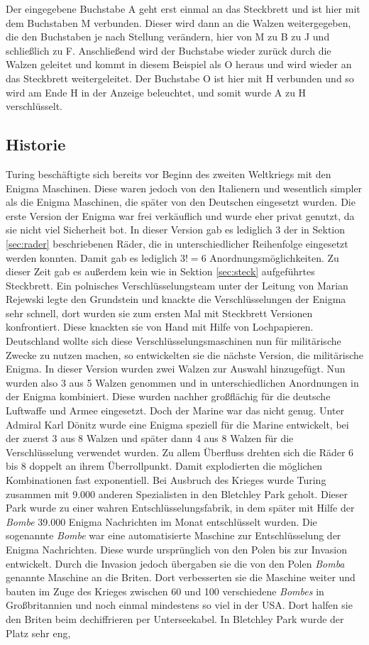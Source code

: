 Der eingegebene Buchstabe A geht erst einmal an das Steckbrett und ist hier mit dem Buchstaben M verbunden. Dieser wird dann an die Walzen weitergegeben, die den Buchstaben je nach Stellung verändern, hier von M zu B zu J und schließlich zu F. Anschließend wird der Buchstabe wieder zurück durch die Walzen geleitet und kommt in diesem Beispiel als O heraus und wird wieder an das Steckbrett weitergeleitet. Der Buchstabe O ist hier mit H verbunden und so wird am Ende H in der Anzeige beleuchtet, und somit wurde A zu H verschlüsselt.

\subsection{Historie}
Turing beschäftigte sich bereits vor Beginn des zweiten Weltkriegs mit den Enigma Maschinen. Diese waren jedoch von den Italienern und wesentlich simpler als die Enigma Maschinen, die später von den Deutschen eingesetzt wurden. Die erste Version der Enigma war frei verkäuflich und wurde eher privat genutzt, da sie nicht viel Sicherheit bot. In dieser Version gab es lediglich 3 der in Sektion \ref{sec:rader} beschriebenen Räder, die in unterschiedlicher Reihenfolge eingesetzt werden konnten. Damit gab es lediglich $3! = 6$ Anordnungsmöglichkeiten. Zu dieser Zeit gab es außerdem kein wie in Sektion \ref{sec:steck} aufgeführtes Steckbrett. Ein polnisches Verschlüsselungsteam unter der Leitung von Marian Rejewski legte den Grundstein und knackte die Verschlüsselungen der Enigma sehr schnell, dort wurden sie zum ersten Mal mit Steckbrett Versionen konfrontiert. Diese knackten sie von Hand mit Hilfe von Lochpapieren. Deutschland wollte sich diese Verschlüsselungsmaschinen nun für militärische Zwecke zu nutzen machen, so entwickelten sie die nächste Version, die militärische Enigma. In dieser Version wurden zwei Walzen zur Auswahl hinzugefügt. Nun wurden also 3 aus 5 Walzen genommen und in unterschiedlichen Anordnungen in der Enigma kombiniert. Diese wurden nachher großflächig für die deutsche Luftwaffe und Armee eingesetzt. Doch der Marine war das nicht genug. Unter Admiral Karl Dönitz wurde eine Enigma speziell für die Marine entwickelt, bei der zuerst 3 aus 8 Walzen und später dann 4 aus 8 Walzen für die Verschlüsselung verwendet wurden. Zu allem Überfluss drehten sich die Räder 6 bis 8 doppelt an ihrem Überrollpunkt. Damit explodierten die möglichen Kombinationen fast exponentiell. Bei Ausbruch des Krieges wurde Turing zusammen mit 9.000 anderen Spezialisten in den Bletchley Park geholt. Dieser Park wurde zu einer wahren Entschlüsselungsfabrik, in dem später mit Hilfe der \emph{Bombe} 39.000 Enigma Nachrichten im Monat entschlüsselt wurden. Die sogenannte \emph{Bombe} war eine automatisierte Maschine zur Entschlüsselung der Enigma Nachrichten. Diese wurde ursprünglich von den Polen bis zur Invasion entwickelt. Durch die Invasion jedoch übergaben sie die von den Polen \emph{Bomba} genannte Maschine an die Briten. Dort verbesserten sie die Maschine weiter und bauten im Zuge des Krieges zwischen 60 und 100 verschiedene \emph{Bombes} in Großbritannien und noch einmal mindestens so viel in der USA. Dort halfen sie den Briten beim dechiffrieren per Unterseekabel. In Bletchley Park wurde der Platz sehr eng, 
